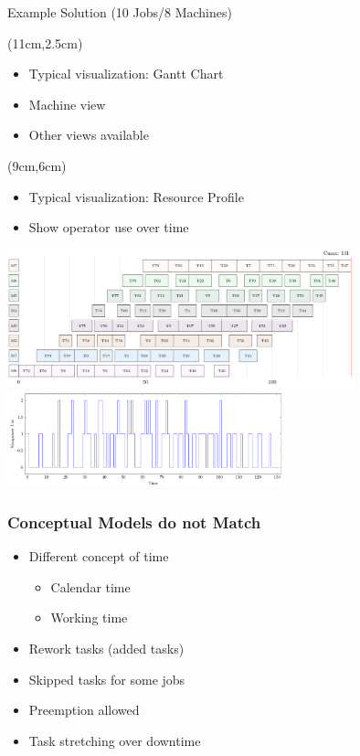\documentclass[dvipsnames,aspectratio=169]{beamer}
\begin{document}
\begin{frame}[label=runningsolution]{Example Solution (10 Jobs/8 Machines)}
\begin{textblock*}{5cm}(11cm,2.5cm)
\begin{itemize}
    \item Typical visualization: Gantt Chart
    \item Machine view
    \item Other views available
\end{itemize}
\end{textblock*}
\begin{textblock*}{6cm}(9cm,6cm)
\begin{itemize}
    \item Typical visualization: Resource Profile
    \item Show operator use over time
\end{itemize}
\end{textblock*}
\includegraphics[width=10cm]{images/flowsolutionlimit2}    
\includegraphics[width=8cm]{images/flowoperatorlimit2.PNG}    
\end{frame}



\begin{frame}
  \frametitle{Conceptual Models do not Match}
  \begin{itemize}
  \item Different concept of time
    \begin{itemize}
        \item Calendar time
        \item Working time
    \end{itemize}
  \item Rework tasks (added tasks)
    \item Skipped tasks for some jobs
  \item Preemption allowed
    \item Task stretching over downtime
  \end{itemize}
\end{frame}
\end{document}
